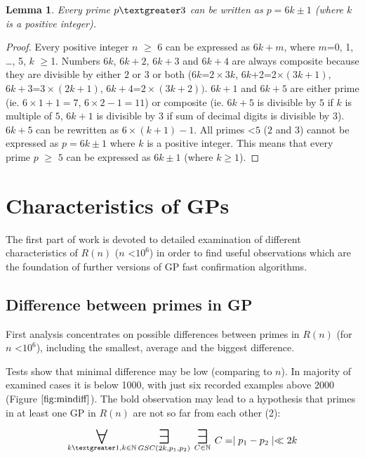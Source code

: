 \documentclass[10pt,twocolumn]{article}
\newtheorem{lemma}[theorem]{Lemma}
\newcommand\bigforall{\mbox{\huge $\mathsurround5pt\forall$}}
\newcommand\bigexists{\mbox{\huge $\mathsurround5pt\exists$}}
\begin{document}
\begin{lemma}
Every prime $p \textgreater 3$ can be written as $p=6k \pm 1$ (where $k$ is a positive integer).
\end{lemma}
\begin{proof}
Every positive integer $n$ $\geq$ 6 can be expressed as $6k+m$, where $m$=0, 1, \ldots, 5, $k$ $\geq$1. Numbers $6k$, $6k+2$, $6k+3$ and $6k+4$ are always composite because they are divisible by either $2$ or $3$ or both ($6k$=$2\times 3k$, $6k$+2=2$\times (3k+1)$, $6k+3$=$3\times (2k+1)$, $6k+4$=$2 \times (3k+2))$. $6k+1$ and $6k+5$ are either prime (ie. $6 \times 1+1=7$, $6 \times 2-1=11$) or composite (ie. $6k+5$ is divisible by $5$ if $k$ is multiple of $5$, $6k+1$ is divisible by $3$ if sum of decimal digits is divisible by $3$). $6k+5$ can be rewritten as $6 \times (k+1)-1$. All primes \textless $5$ ($2$ and $3$) cannot be expressed as $p=6k \pm 1$ where $k$ is a positive integer. This means that every prime $p$ $\geq$ $5$ can be expressed as $6k \pm 1$ (where $k \geq 1$).
\end{proof}

\section{Characteristics of GPs}

The first part of work is devoted to detailed examination of different characteristics of $R(n)$ ($n$ \textless $10^6$) in order to find useful observations which are the foundation of further versions of GP fast confirmation algorithms.

\subsection{Difference between primes in GP}

First analysis concentrates on possible differences between primes in $R(n)$ (for $n$ \textless $10^6$), including the smallest, average and the biggest difference. \par
Tests show that minimal difference may be low (comparing to $n$). In majority of examined cases it is below 1000, with just  six recorded examples above 2000 (Figure $\ref{fig:mindiff}$). The bold observation may lead to a hypothesis that primes in at least one GP in $R(n)$ are not so far from each other (2): \par

\begin{equation}
\displaystyle\mathop{\bigforall}_{k \textgreater 1, k \in \mathbb{N}} \displaystyle\mathop{\bigexists}_{GSC (2k, p_1, p_2)}\displaystyle\mathop{\bigexists}_{C \in \mathbb{N}} C = \mid p_1 - p_2 \mid \ll 2k
\end{equation}
\end{document}
